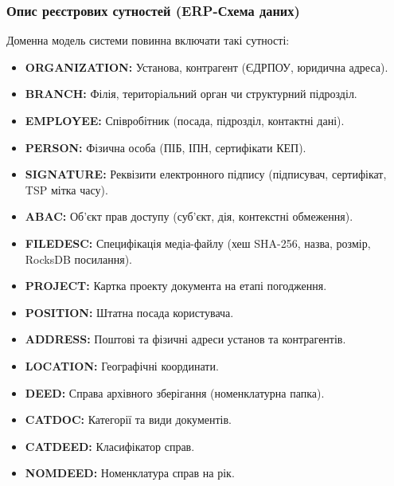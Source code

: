 \documentclass{article}
\begin{document}
\subsubsection{Опис реєстрових сутностей (ERP-Схема даних)}
Доменна модель системи повинна включати такі сутності:
\begin{itemize}
    \item \textbf{ORGANIZATION:} Установа, контрагент (ЄДРПОУ, юридична адреса).
    \item \textbf{BRANCH:} Філія, територіальний орган чи структурний підрозділ.
    \item \textbf{EMPLOYEE:} Співробітник (посада, підрозділ, контактні дані).
    \item \textbf{PERSON:} Фізична особа (ПІБ, ІПН, сертифікати КЕП).
    \item \textbf{SIGNATURE:} Реквізити електронного підпису (підписувач, сертифікат, TSP мітка часу).
    \item \textbf{ABAC:} Об'єкт прав доступу (суб'єкт, дія, контекстні обмеження).
    \item \textbf{FILEDESC:} Специфікація медіа-файлу (хеш SHA-256, назва, розмір, RocksDB посилання).
    \item \textbf{PROJECT:} Картка проекту документа на етапі погодження.
    \item \textbf{POSITION:} Штатна посада користувача.
    \item \textbf{ADDRESS:} Поштові та фізичні адреси установ та контрагентів.
    \item \textbf{LOCATION:} Географічні координати.
    \item \textbf{DEED:} Справа архівного зберігання (номенклатурна папка).
    \item \textbf{CATDOC:} Категорії та види документів.
    \item \textbf{CATDEED:} Класифікатор справ.
    \item \textbf{NOMDEED:} Номенклатура справ на рік.
\end{itemize}
\end{document}
